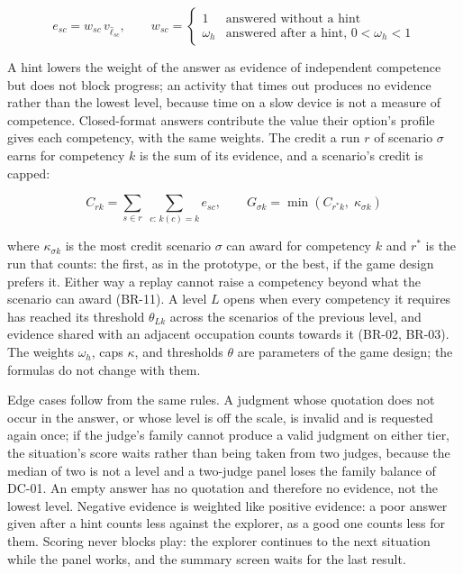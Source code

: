 \begin{equation}
e_{sc} = w_{sc}\, v_{\hat{\ell}_{sc}}, \qquad w_{sc} = \begin{cases} 1 & \text{answered without a hint} \\ \omega_h & \text{answered after a hint, } 0 < \omega_h < 1 \end{cases}
\end{equation}

A hint lowers the weight of the answer as evidence of independent competence but does not block progress; an activity that times out produces no evidence rather than the lowest level, because time on a slow device is not a measure of competence. Closed-format answers contribute the value their option's profile gives each competency, with the same weights. The credit a run $r$ of scenario $\sigma$ earns for competency $k$ is the sum of its evidence, and a scenario's credit is capped:

\begin{equation}
C_{rk} = \sum_{s \in r} \; \sum_{c:\,k(c)=k} e_{sc}, \qquad G_{\sigma k} = \min\!\left(C_{r^{*}k},\; \kappa_{\sigma k}\right)
\end{equation}

where $\kappa_{\sigma k}$ is the most credit scenario $\sigma$ can award for competency $k$ and $r^{*}$ is the run that counts: the first, as in the prototype, or the best, if the game design prefers it. Either way a replay cannot raise a competency beyond what the scenario can award (BR-11). A level $L$ opens when every competency it requires has reached its threshold $\theta_{Lk}$ across the scenarios of the previous level, and evidence shared with an adjacent occupation counts towards it (BR-02, BR-03). The weights $\omega_h$, caps $\kappa$, and thresholds $\theta$ are parameters of the game design; the formulas do not change with them.

Edge cases follow from the same rules. A judgment whose quotation does not occur in the answer, or whose level is off the scale, is invalid and is requested again once; if the judge's family cannot produce a valid judgment on either tier, the situation's score waits rather than being taken from two judges, because the median of two is not a level and a two-judge panel loses the family balance of DC-01. An empty answer has no quotation and therefore no evidence, not the lowest level. Negative evidence is weighted like positive evidence: a poor answer given after a hint counts less against the explorer, as a good one counts less for them. Scoring never blocks play: the explorer continues to the next situation while the panel works, and the summary screen waits for the last result.

